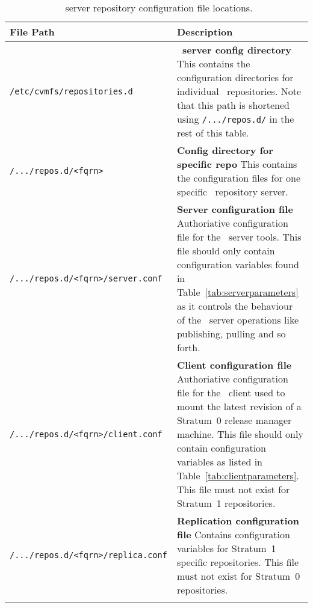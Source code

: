 \begin{longtable}{lX}
	\toprule
	{\bf\centering File Path} & {\bf\centering Description} \\
	\midrule

	\texttt{/etc/cvmfs/repositories.d} & \textbf{\cvmfs\ server config directory} \newline
	This contains the configuration directories for individual \cvmfs\ repositories. Note that this path is shortened using \texttt{/.../repos.d/} in the rest of this table. \\
	\addlinespace

	\texttt{/.../repos.d/<fqrn>} & \textbf{Config directory for specific repo} \newline
	This contains the configuration files for one specific \cvmfs\ repository server. \\
	\addlinespace

	\texttt{/.../repos.d/<fqrn>/server.conf} & \textbf{Server configuration file} \newline
	Authoriative configuration file for the \cvmfs\ server tools. This file should only contain configuration variables found in Table~\ref{tab:serverparameters} as it controls the behaviour of the \cvmfs\ server operations like publishing, pulling and so forth. \\
	\addlinespace

	\texttt{/.../repos.d/<fqrn>/client.conf} & \textbf{Client configuration file} \newline
	Authoriative configuration file for the \cvmfs\ client used to mount the latest revision of a Stratum~0 release manager machine. This file should only contain configuration variables as listed in Table~\ref{tab:clientparameters}. This file must not exist for Stratum~1 repositories. \\
	\addlinespace

	\texttt{/.../repos.d/<fqrn>/replica.conf} & \textbf{Replication configuration file} \newline
	Contains configuration variables for Stratum~1 specific repositories. This file must not exist for Stratum~0 repositories. \\
	\addlinespace

	\bottomrule
	\caption{\cvmfs\ server repository configuration file locations.}
	\label{tbl:repoconfiganatomy}
\end{longtable}